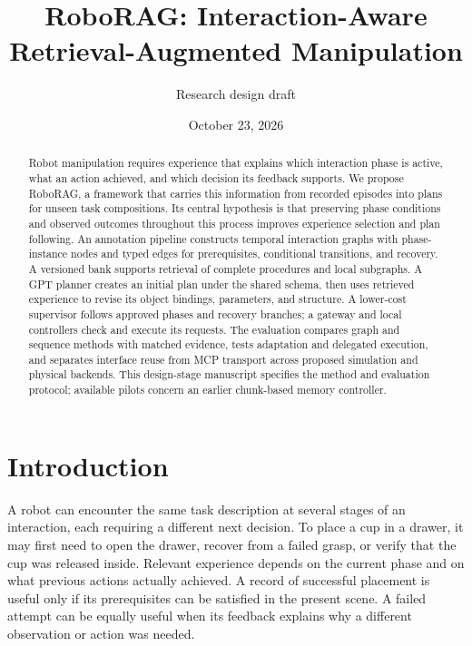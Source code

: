 \documentclass[10pt,twocolumn,letterpaper]{article}
\title{RoboRAG: Interaction-Aware Retrieval-Augmented Manipulation}
\author{Research design draft}
\date{October 23, 2026}
\begin{document}
\maketitle

\begin{abstract}
Robot manipulation requires experience that explains which interaction phase is active, what an action achieved, and which decision its feedback supports. We propose RoboRAG, a framework that carries this information from recorded episodes into plans for unseen task compositions. Its central hypothesis is that preserving phase conditions and observed outcomes throughout this process improves experience selection and plan following. An annotation pipeline constructs temporal interaction graphs with phase-instance nodes and typed edges for prerequisites, conditional transitions, and recovery. A versioned bank supports retrieval of complete procedures and local subgraphs. A GPT planner creates an initial plan under the shared schema, then uses retrieved experience to revise its object bindings, parameters, and structure. A lower-cost supervisor follows approved phases and recovery branches; a gateway and local controllers check and execute its requests. The evaluation compares graph and sequence methods with matched evidence, tests adaptation and delegated execution, and separates interface reuse from MCP transport across proposed simulation and physical backends. This design-stage manuscript specifies the method and evaluation protocol; available pilots concern an earlier chunk-based memory controller.
\end{abstract}



\section{Introduction}
\label{sec:introduction}

A robot can encounter the same task description at several stages of an interaction, each requiring a different next decision. To place a cup in a drawer, it may first need to open the drawer, recover from a failed grasp, or verify that the cup was released inside. Relevant experience depends on the current phase and on what previous actions actually achieved. A record of successful placement is useful only if its prerequisites can be satisfied in the present scene. A failed attempt can be equally useful when its feedback explains why a different observation or action was needed.
\end{document}
